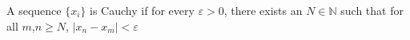 \documentclass[preview]{standalone}
\begin{document}
\begin{center}
A sequence $\{x_i\}$ is Cauchy if for every $\varepsilon > 0$, there exists an $N$$\in \mathbb{N}$ such that for all $m$,$n$$\geq N$, $\left| x_n - x_m \right| < \varepsilon$
\end{center}
\end{document}
